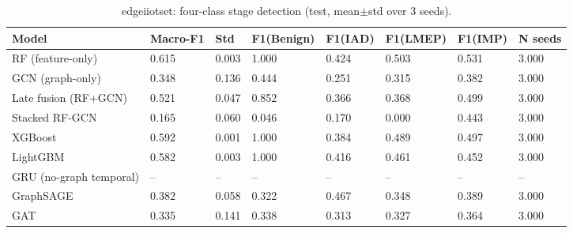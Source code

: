 \begin{table}[t]
\centering
\caption{edgeiiotset: four-class stage detection (test, mean$\pm$std over 3 seeds).}
\label{tab:edgeiiotset_stage_detection}
\begin{tabular}{llllllll}
\toprule
Model & Macro-F1 & Std & F1(Benign) & F1(IAD) & F1(LMEP) & F1(IMP) & N seeds \\
\midrule
RF (feature-only) & 0.615 & 0.003 & 1.000 & 0.424 & 0.503 & 0.531 & 3.000 \\
GCN (graph-only) & 0.348 & 0.136 & 0.444 & 0.251 & 0.315 & 0.382 & 3.000 \\
Late fusion (RF+GCN) & 0.521 & 0.047 & 0.852 & 0.366 & 0.368 & 0.499 & 3.000 \\
Stacked RF-GCN & 0.165 & 0.060 & 0.046 & 0.170 & 0.000 & 0.443 & 3.000 \\
XGBoost & 0.592 & 0.001 & 1.000 & 0.384 & 0.489 & 0.497 & 3.000 \\
LightGBM & 0.582 & 0.003 & 1.000 & 0.416 & 0.461 & 0.452 & 3.000 \\
GRU (no-graph temporal) & -- & -- & -- & -- & -- & -- & -- \\
GraphSAGE & 0.382 & 0.058 & 0.322 & 0.467 & 0.348 & 0.389 & 3.000 \\
GAT & 0.335 & 0.141 & 0.338 & 0.313 & 0.327 & 0.364 & 3.000 \\
\bottomrule
\end{tabular}
\end{table}
